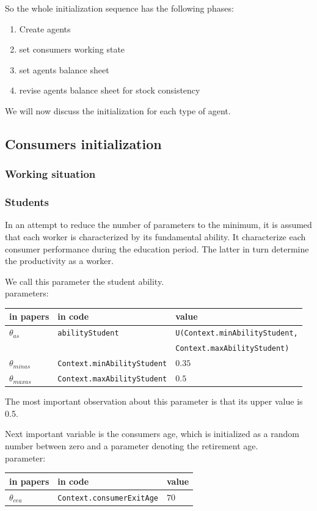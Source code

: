 \documentclass{article}
\begin{document}
So the whole initialization sequence has the following phases:
\begin{enumerate}
	\item Create agents
	\item set consumers working state
	\item set agents balance sheet
	\item revise agents balance sheet for stock consistency
\end{enumerate}

We will now discuss the initialization for each type of agent.

\subsection{Consumers initialization}

\subsubsection{Working situation}


\subsubsection*{Students}

In an attempt to reduce the number of parameters to the minimum, it is assumed that each worker is characterized by its fundamental ability. It characterize each consumer performance during the education period. The latter in turn determine the productivity as a worker.

We call this parameter the student ability.\\
parameters:\\
\begin{tabular}{l l l}
	\hline
	in papers& in code&value\\
	\hline
	\hline
$\theta_{as}$&\verb+abilityStudent+&\verb+U(Context.minAbilityStudent,+\\
& &\verb+Context.maxAbilityStudent)+\\
 $\theta_{minas}$&\verb+Context.minAbilityStudent+&$0.35$\\
 $\theta_{maxas}$&\verb+Context.maxAbilityStudent+&$0.5$\\
	\hline
\end{tabular}

\vskip5mm
The most important observation about this parameter is that its upper value is 0.5.

Next important variable is the consumers age, which is initialized as a random number between zero and a parameter denoting the retirement age.\\
parameter:\\
\begin{tabular}{l l l}
	\hline
	in papers& in code&value\\
	\hline
	\hline
 $\theta_{cea}$&\verb+Context.consumerExitAge+&$70$\\
	\hline
\end{tabular}
\end{document}
